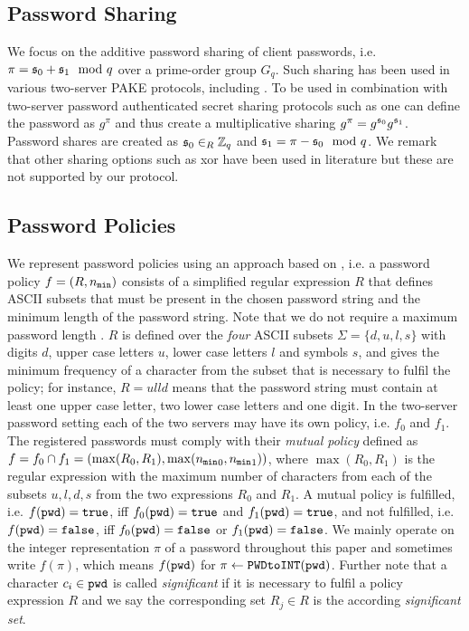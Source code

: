 \subsection{Password Sharing}
We focus on the additive password sharing of client passwords, i.e. $\pi=\mathfrak{s}_0+\mathfrak{s}_1 \mod q$ over a prime-order group $G_q$.
Such sharing has been used in various two-server PAKE protocols, including  \cite{Katz2005,Yang_Deng_Bao_2006,Jin_Wong_Xu_2007,Kiefer14}.
To be used in combination with two-server password authenticated secret sharing protocols such as \cite{CamenischLN2012} one can define the password as $g^\pi$ and thus create a multiplicative sharing $g^\pi=g^{\mathfrak{s}_0}g^{\mathfrak{s}_1}$.
Password shares are created as $\mathfrak{s}_0\in_R\mathbb{Z}_q$ and $\mathfrak{s}_1=\pi-\mathfrak{s}_0 \mod q$.
We remark that other sharing options such as xor \cite{Brainard2003,SzydloK05} have been used in literature but these are not supported by our protocol.


\subsection{Password Policies}
We represent password policies using an approach based on \cite{KieferM14c}, i.e. a password policy $f=(R,{n_\mathtt{min}})$ consists of a simplified regular expression $R$ that defines ASCII subsets that must be present in the chosen password string and the minimum length \pmin of the password string.
Note that we do not require a maximum password length \pmax.
$R$ is defined over the \emph{four} ASCII subsets $\Sigma=\{d,u,l,s\}$ with digits $d$, upper case letters $u$, lower case letters $l$ and symbols $s$, and gives the minimum frequency of a character from the subset that is necessary to fulfil the policy; for instance, $R=ulld$ means that the password string must contain at least one upper case letter, two lower case letters and one digit.
In the two-server password setting each of the two servers may have its own policy, i.e. $f_0$ and $f_1$.
The registered passwords must comply with their \emph{mutual policy} defined as $f=f_0\cap f_1=(\max(R_0,R_1),\max({n_\mathtt{min}}_0,{n_\mathtt{min}}_1))$, where $\max(R_0,R_1)$ is the regular expression with the maximum number of characters from each of the subsets $u,l,d,s$ from the two expressions $R_0$ and $R_1$.
A mutual policy is fulfilled, i.e. $f(\mathtt{pwd})=\mathtt{true}$, iff $f_0(\mathtt{pwd})=\mathtt{true}$ and $f_1(\mathtt{pwd})=\mathtt{true}$, and not fulfilled, i.e. $f(\mathtt{pwd})=\mathtt{false}$, iff $f_0(\mathtt{pwd})=\mathtt{false}$ or $f_1(\mathtt{pwd})=\mathtt{false}$.
We mainly operate on the integer representation $\pi$ of a password \pwd throughout this paper and sometimes write $f(\pi)$, which means $f(\mathtt{pwd})$ for $\pi\gets\texttt{PWDtoINT}(\mathtt{pwd})$.
Further note that a character $c_i\in\mathtt{pwd}$ is called \emph{significant} if it is necessary to fulfil a policy expression $R$ and we say the corresponding set $R_j\in R$ is the according \emph{significant set}.
